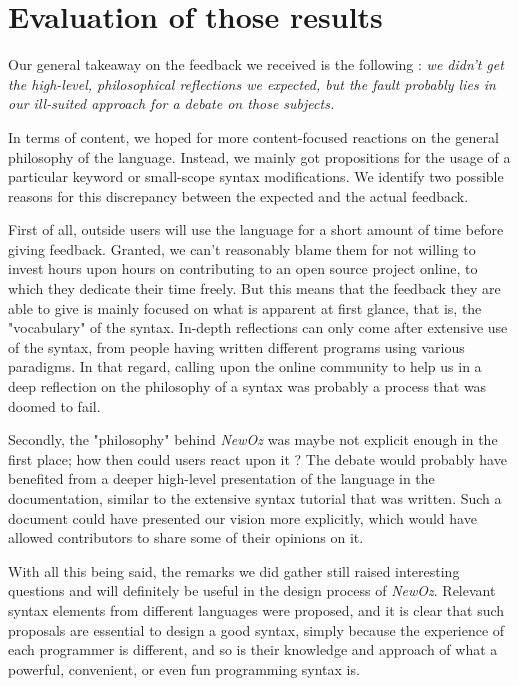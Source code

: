 \section{Evaluation of those results}\label{sec:ch4-evaluation}
Our general takeaway on the feedback we received is the following : \emph{we didn't get the high-level, philosophical reflections we expected, but the fault probably lies in our ill-suited approach for a debate on those subjects.}\newline

In terms of content, we hoped for more content-focused reactions on the general philosophy of the language.
Instead, we mainly got propositions for the usage of a particular keyword or small-scope syntax modifications.
We identify two possible reasons for this discrepancy between the expected and the actual feedback.\newline

First of all, outside users will use the language for a short amount of time before giving feedback.
Granted, we can't reasonably blame them for not willing to invest hours upon hours on contributing to an open source project online, to which they dedicate their time freely.
But this means that the feedback they are able to give is mainly focused on what is apparent at first glance, that is, the "vocabulary" of the syntax.
In-depth reflections can only come after extensive use of the syntax, from people having written different programs using various paradigms.
In that regard, calling upon the online community to help us in a deep reflection on the philosophy of a syntax was probably a process that was doomed to fail.\newline

Secondly, the "philosophy" behind \textit{NewOz} was maybe not explicit enough in the first place;
how then could users react upon it ?
The debate would probably have benefited from a deeper high-level presentation of the language in the documentation, similar to the extensive syntax tutorial that was written.
Such a document could have presented our vision more explicitly, which would have allowed contributors to share some of their opinions on it.\newline

With all this being said, the remarks we did gather still raised interesting questions and will definitely be useful in the design process of \textit{NewOz}.
Relevant syntax elements from different languages were proposed, and it is clear that such proposals are essential to design a good syntax, simply because the experience of each programmer is different, and so is their knowledge and approach of what a powerful, convenient, or even fun programming syntax is.

